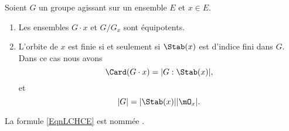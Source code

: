 \begin{proposition}      \label{Propszymlr}
	Soient \( G\) un groupe agissant sur un ensemble \( E\) et \( x\in E\).
	\begin{enumerate}
		\item
		      Les ensembles \( G \cdot x\) et \( G/G_x\) sont équipotents.
		\item       \label{ITEMooCWUGooCOFHYk}
		      L'orbite de \(x\) est finie si et seulement si \( \Stab(x)\) est d'indice fini dans \( G\). Dans ce cas nous avons
		      \begin{equation}        \label{EqnLCHCE}
                  \Card(G\cdot x)=| G:\Stab(x) |,
		      \end{equation}
              et
		      \begin{equation}        \label{EqCewSXT}
			      | G |=| \Stab(x) | |\mO_x |.
		      \end{equation}
	\end{enumerate}
    La formule \eqref{EqnLCHCE}  est nommée \cite{BIBooGVEDooJXFGuc}.
\end{proposition}

